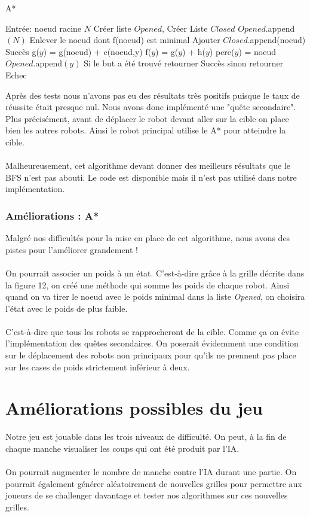 \documentclass{article}
\begin{document}
\begin{algorithm}[H]
\caption{A*}
\label{alg:dfs-reach}
\begin{algorithmic}[3]
  \STATE Entrée: noeud racine  $N$
  \STATE Créer liste $Opened$, Créer Liste $Closed$
  \STATE $Opened$.append$(N)$
    \STATE Enlever le noeud dont f(noeud) est minimal
    \STATE Ajouter $Closed$.append(noeud)
    		\RETURN Succès
    \ELSE
    				\STATE g($y$) = g(noeud) + c(noeud,y)
    				\STATE f($y$) = g($y$) + h($y$)
    				\STATE pere($y$) = noeud
    				\STATE $Opened$.append$(y)$
    			\ENDIF
    		\ENDFOR
    	\ENDIF
  \ENDWHILE
  \STATE Si le but a été trouvé retourner Succès sinon retourner Echec
\end{algorithmic}
\end{algorithm}
Après des tests nous n'avons pas eu des résultats très positifs puisque le taux de réussite était presque nul. Nous avons donc implémenté une "quête secondaire". Plus précisément, avant de déplacer le robot devant aller sur la cible on place bien les autres robots. Ainsi le robot principal utilise le A* pour atteindre la cible.\\\\
Malheureusement, cet algorithme devant donner des meilleurs résultats que le BFS n'est pas abouti. Le code est disponible mais il n'est pas utilisé dans notre implémentation.
\subsubsection{Améliorations : A*}
Malgré nos difficultés pour la mise en place de cet algorithme, nous avons des pistes pour l'améliorer grandement !\\\\
On pourrait associer un poids à un état. C'est-à-dire grâce à la grille décrite dans la figure 12, on créé une méthode qui somme les poids de chaque robot. Ainsi quand on va tirer le noeud avec le poids minimal dans la liste \textit{Opened}, on choisira l'état avec le poids de plus faible.\\\\
C'est-à-dire que tous les robots se rapprocheront de la cible. Comme ça on évite l'implémentation des quêtes secondaires. On poserait évidemment une condition sur le déplacement des robots non principaux pour qu'ils ne prennent pas place sur les cases de poids strictement inférieur à deux.   
\section{Améliorations possibles du jeu}
Notre jeu est jouable dans les trois niveaux de difficulté. On peut, à la fin de chaque manche visualiser les coups qui ont été produit par l'IA.\\\\
On pourrait augmenter le nombre de manche contre l'IA durant une partie. On pourrait également générer aléatoirement de nouvelles grilles pour permettre aux joueurs de se challenger davantage et tester nos algorithmes sur ces nouvelles grilles. 
\end{document}
